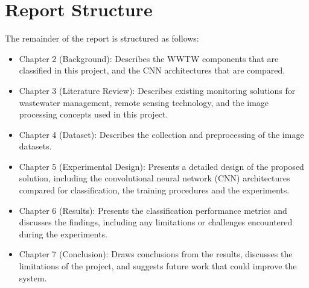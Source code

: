 \section{Report Structure}
The remainder of the report is structured as follows:
\begin{itemize}[label=$\circ$]
    \item Chapter 2 (Background): Describes the WWTW components that are classified in this project, and the CNN architectures that are compared.
    \item Chapter 3 (Literature Review): Describes existing monitoring solutions for wastewater management, remote sensing technology, and the image processing concepts used in this project.
    \item Chapter 4 (Dataset): Describes the collection and preprocessing of the image datasets.
    \item Chapter 5 (Experimental Design): Presents a detailed design of the proposed solution, including the convolutional neural network (CNN) architectures compared for classification, the training procedures and the experiments.
    \item Chapter 6 (Results): Presents the classification performance metrics and discusses the findings, including any limitations or challenges encountered during the experiments.
    \item Chapter 7 (Conclusion): Draws conclusions from the results, discusses the limitations of the project, and suggests future work that could improve the system.
\end{itemize}


